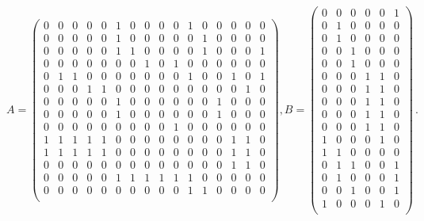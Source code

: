 \begin{equation}
    A = \begin{pmatrix}
        0 & 0 & 0 & 0 & 0 & 1 & 0 & 0 & 0 & 0 &1 & 0 & 0 & 0 & 0 & 0 \\
        0 & 0 & 0 & 0 & 0 & 1 & 0 & 0 & 0 & 0 & 0 & 1 & 0 & 0 & 0 & 0 \\
        0 & 0 & 0 & 0 & 0 & 1 & 1 & 0 & 0 & 0 & 0 & 1 & 0 & 0 & 0 & 1 \\
        0 & 0 & 0 & 0 & 0 & 0 & 0 & 1 & 0 & 1 & 0 & 0 & 0 & 0 & 0 & 0 \\
        0 & 1 & 1 & 0 & 0 & 0 & 0 & 0 & 0 & 0 & 1 & 0 & 0 & 1 & 0 & 1 \\
        0 & 0 & 0 & 1 & 1 & 0 & 0 & 0 & 0 & 0 & 0 & 0 & 0 & 0 & 1 & 0 \\
        0 & 0 & 0 & 0 & 0 & 1 & 0 & 0 & 0 & 0 & 0 & 0 & 1 & 0 & 0 & 0 \\
        0 & 0 & 0 & 0 & 0 & 1 & 0 & 0 & 0 & 0 & 0 & 0 & 1 & 0 & 0 & 0 \\
        0 & 0 & 0 & 0 & 0 & 0 & 0 & 0 & 0 & 1 & 0 & 0 & 0 & 0 & 0 & 0 \\
        1 & 1 & 1 & 1 & 1 & 0 & 0 & 0 & 0 & 0 & 0 & 0 & 0 & 1 & 1 & 0 \\
        1 & 1 & 1 & 1 & 1 & 0 & 0 & 0 & 0 & 0 & 0 & 0 & 0 & 1 & 1 & 0 \\
        0 & 0 & 0 & 0 & 0 & 0 & 0 & 0 & 0 & 0 & 0 & 0 & 0 & 1 & 1 & 0 \\
        0 & 0 & 0 & 0 & 0 & 1 & 1 & 1 & 1 & 1 & 1 & 0 & 0 & 0 & 0 & 0 \\
        0 & 0 & 0 & 0 & 0 & 0 & 0 & 0 & 0 & 0 & 1 & 1 & 0 & 0 & 0 & 0 \\
    \end{pmatrix},
%
    B = \begin{pmatrix}
        0 & 0 & 0 & 0 & 0 & 1 \\
        0 & 1 & 0 & 0 & 0 & 0 \\
        0 & 1 & 0 & 0 & 0 & 0 \\
        0 & 0 & 1 & 0 & 0 & 0 \\
        0 & 0 & 1 & 0 & 0 & 0 \\
        0 & 0 & 0 & 1 & 1 & 0 \\
        0 & 0 & 0 & 1 & 1 & 0 \\
        0 & 0 & 0 & 1 & 1 & 0 \\
        0 & 0 & 0 & 1 & 1 & 0 \\
        0 & 0 & 0 & 1 & 1 & 0 \\
        1 & 0 & 0 & 0 & 1 & 0 \\
        1 & 1 & 0 & 0 & 0 & 0 \\
        0 & 1 & 1 & 0 & 0 & 1 \\
        0 & 1 & 0 & 0 & 0 & 1 \\
        0 & 0 & 1 & 0 & 0 & 1 \\
        1 & 0 & 0 & 0 & 1 & 0 \\
    \end{pmatrix}\,.
\end{equation}

